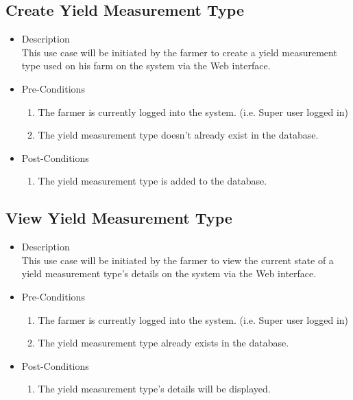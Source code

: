 \documentclass[11pt,fleqn]{book} %
\begin{document}
		\subsection{Create Yield Measurement Type}
		\begin{itemize}
			\item Description\\
			This use case will be initiated by the farmer to create a yield measurement type used on his farm on the system via the Web interface.
			\item Pre-Conditions
			\begin{enumerate}
				\item The farmer is currently logged into the system. (i.e. Super user logged in)
				\item The yield measurement type doesn’t already exist in the database. 				
			\end{enumerate}
			\item Post-Conditions
			\begin{enumerate}
				\item The yield measurement type is added to the database.
			\end{enumerate}
		\end{itemize}
		
		\subsection{View Yield Measurement Type}
		\begin{itemize}
			\item Description\\
			This use case will be initiated by the farmer to view the current state of a yield measurement type’s details on the system via the Web interface.
			\item Pre-Conditions
			\begin{enumerate}
				\item The farmer is currently logged into the system. (i.e. Super user logged in)
				\item The yield measurement type already exists in the database.		
			\end{enumerate}
			\item Post-Conditions
			\begin{enumerate}
				\item The yield measurement type’s details will be displayed.
			\end{enumerate}
		\end{itemize}
		
\end{document}

